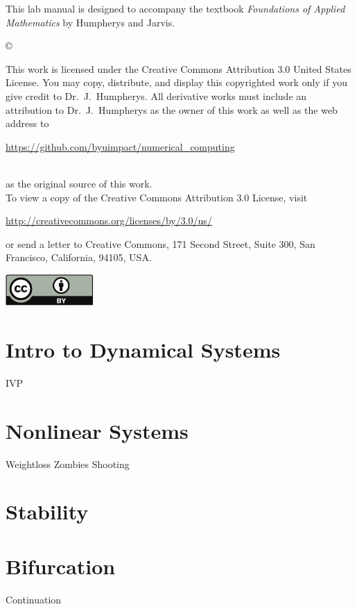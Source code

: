\documentclass[nociteref]{newsiambook}
\begin{document}
\begin{thepreface}
This lab manual is designed to accompany the textbook \emph{Foundations of Applied Mathematics} by Humpherys and Jarvis.

\vfill
\copyright{This work is licensed under the Creative Commons Attribution 3.0 United States 
License.  You may copy, distribute, and display this copyrighted work only if you give 
credit to Dr.~J.~Humpherys. All derivative works must include an attribution to Dr.~J.~Humpherys as the owner of this work as well as the web address to 
\\\centerline{\url{https://github.com/byuimpact/numerical_computing}}\\ as the original source of 
this 
work.\\To view a copy of the Creative Commons Attribution 3.0 License, 
visit\\\centerline{\url{http://creativecommons.org/licenses/by/3.0/us/}} or send a letter to 
Creative Commons, 171 Second Street, Suite 300, San Francisco, California, 94105, USA.}

\vfill
\centering\includegraphics[height=1.2cm]{by}
\vfill
\end{thepreface}

\setcounter{tocdepth}{1}
\tableofcontents

\mainmatter

\part{Intro to Dynamical Systems}
{IVP}

\part{Nonlinear Systems}
{Weightloss}
{Zombies}
{Shooting}

\part{Stability}

\part{Bifurcation}
{Continuation}
\end{document}
